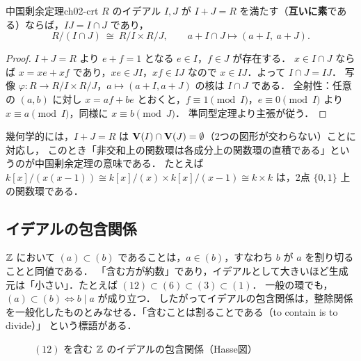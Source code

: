 \begin{mythm}{中国剰余定理}{ch02-crt}
$R$ のイデアル $I,J$ が $I+J=R$ を満たす（\textbf{互いに素}である）ならば，$IJ=I\cap J$ であり，
\[
  R/(I\cap J)\ \cong\ R/I\times R/J,\qquad a+I\cap J\mapsto(a+I,\ a+J).
\]
\end{mythm}

\begin{proof}
$I+J=R$ より $e+f=1$ となる $e\in I$，$f\in J$ が存在する．
$x\in I\cap J$ ならば $x=xe+xf$ であり，$xe\in JI$，$xf\in IJ$ なので $x\in IJ$．よって $I\cap J=IJ$．
写像 $\varphi:R\to R/I\times R/J$，$a\mapsto(a+I,a+J)$ の核は $I\cap J$ である．
全射性：任意の $(a,b)$ に対し $x=af+be$ とおくと，$f\equiv1\pmod I$，$e\equiv0\pmod I$ より $x\equiv a\pmod I$，同様に $x\equiv b\pmod J$．
準同型定理より主張が従う．
\end{proof}

幾何学的には，$I+J=R$ は $\mathbf{V}(I)\cap\mathbf{V}(J)=\emptyset$（2つの図形が交わらない）ことに対応し，
このとき「非交和上の関数環は各成分上の関数環の直積である」というのが中国剰余定理の意味である．
たとえば $k[x]/(x(x-1))\cong k[x]/(x)\times k[x]/(x-1)\cong k\times k$ は，2点 $\{0,1\}$ 上の関数環である．

\subsection{イデアルの包含関係}

$\mathbb{Z}$ において $(a)\subset(b)$ であることは，$a\in(b)$，すなわち $b$ が $a$ を割り切ることと同値である．
「含む方が約数」であり，イデアルとして大きいほど生成元は「小さい」．たとえば $(12)\subset(6)\subset(3)\subset(1)$．
一般の環でも，$(a)\subset(b)\iff b\mid a$ が成り立つ．
したがってイデアルの包含関係は，整除関係を一般化したものとみなせる．「含むことは割ることである（to contain is to divide）」
という標語がある．

\begin{figure}[H]
\centering
{}
\caption{$(12)$ を含む $\mathbb{Z}$ のイデアルの包含関係（Hasse図）}
\label{fig:ch02-hasse}
\end{figure}

